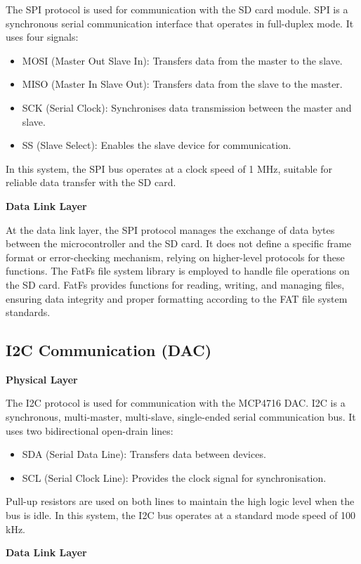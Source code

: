 The SPI protocol is used for communication with the SD card module. SPI is a synchronous serial communication 
interface that operates in full-duplex mode. It uses four signals:
\begin{itemize}
    \item MOSI (Master Out Slave In): Transfers data from the master to the slave.
    \item MISO (Master In Slave Out): Transfers data from the slave to the master.
    \item SCK (Serial Clock): Synchronises data transmission between the master and slave.
    \item SS (Slave Select): Enables the slave device for communication.
\end{itemize}
In this system, the SPI bus operates at a clock speed of 1 MHz, suitable for reliable data transfer 
with the SD card.

\textbf{Data Link Layer}

At the data link layer, the SPI protocol manages the exchange of data bytes between the microcontroller 
and the SD card. It does not define a specific frame format or error-checking mechanism, relying on 
higher-level protocols for these functions. The FatFs file system library is employed to handle file 
operations on the SD card. FatFs provides functions for reading, writing, and managing files, ensuring 
data integrity and proper formatting according to the FAT file system standards.

\subsection{I2C Communication (DAC)}
\textbf{Physical Layer}

The I2C protocol is used for communication with the MCP4716 DAC. I2C is a synchronous, multi-master, 
multi-slave, single-ended serial communication bus. It uses two bidirectional open-drain lines:
\begin{itemize}
    \item SDA (Serial Data Line): Transfers data between devices.
    \item SCL (Serial Clock Line): Provides the clock signal for synchronisation.
\end{itemize}
Pull-up resistors are used on both lines to maintain the high logic level when the bus is idle. 
In this system, the I2C bus operates at a standard mode speed of 100 kHz.

\textbf{Data Link Layer}


